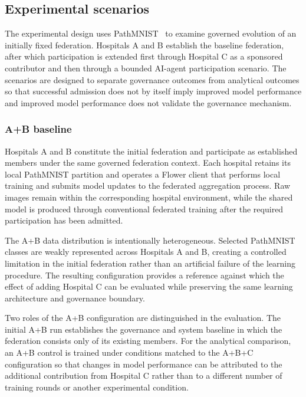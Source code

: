 \documentclass[twoside,11pt]{article}
\begin{document}
\subsection{Experimental scenarios}

The experimental design uses PathMNIST~\cite{Yang_2023_MedMNIST,  Kather_2019} to examine governed evolution of an initially fixed federation. Hospitals A and B establish the baseline federation, after which participation is extended first through Hospital C as a sponsored contributor and then through a bounded AI-agent participation scenario. The scenarios are designed to separate governance outcomes from analytical outcomes so that successful admission does not by itself imply improved model performance and improved model performance does not validate the governance mechanism.

\subsubsection{A+B baseline}

Hospitals A and B constitute the initial federation and participate as established members under the same governed federation context. Each hospital retains its local PathMNIST partition and operates a Flower client that performs local training and submits model updates to the federated aggregation process. Raw images remain within the corresponding hospital environment, while the shared model is produced through conventional federated training after the required participation has been admitted.

The A+B data distribution is intentionally heterogeneous. Selected PathMNIST classes are weakly represented across Hospitals A and B, creating a controlled limitation in the initial federation rather than an artificial failure of the learning procedure. The resulting configuration provides a reference against which the effect of adding Hospital C can be evaluated while preserving the same learning architecture and governance boundary.

Two roles of the A+B configuration are distinguished in the evaluation. The initial A+B run establishes the governance and system baseline in which the federation consists only of its existing members. For the analytical comparison, an A+B control is trained under conditions matched to the A+B+C configuration so that changes in model performance can be attributed to the additional contribution from Hospital C rather than to a different number of training rounds or another experimental condition.
\end{document}
